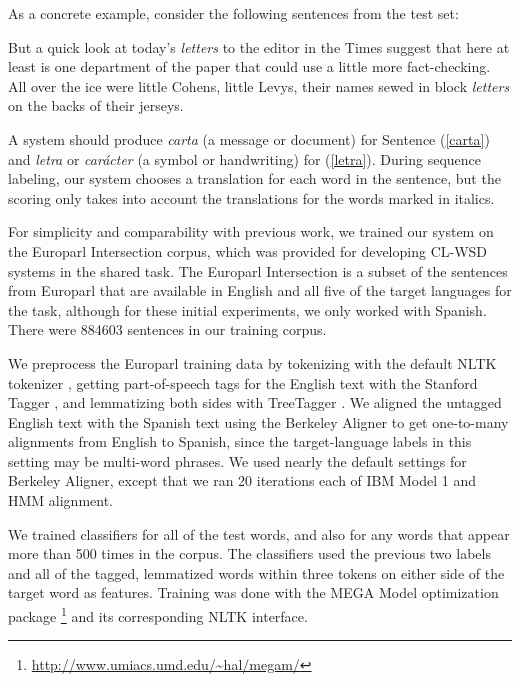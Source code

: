As a concrete example, consider the following sentences from the test set:

\begin{exe}
\ex\label{carta} But a quick look at today's \emph{letters} to the editor in
the Times suggest that here at least is one department of the paper that could
use a little more fact-checking.
\ex\label{letra} All over the ice were little Cohens, little Levys, their names
sewed in block \emph{letters} on the backs of their jerseys.
\end{exe}

A system should produce \emph{carta} (a message or document) for Sentence
(\ref{carta}) and \emph{letra} or \emph{car\'{a}cter} (a symbol or handwriting)
for (\ref{letra}). During sequence labeling, our system chooses a translation
for each word in the sentence, but the scoring only takes into account the
translations for the words marked in italics.

For simplicity and comparability with previous work, we trained our system on
the Europarl Intersection corpus, which was provided for developing CL-WSD
systems in the shared task.  The Europarl Intersection is a subset of the
sentences from Europarl \cite{europarl} that are available in English and all
five of the target languages for the task, although for these initial
experiments, we only worked with Spanish. There were 884603 sentences in our
training corpus.

We preprocess the Europarl training data by tokenizing with the default NLTK
tokenizer \cite{nltkbook}, getting part-of-speech tags for the English text
with the Stanford Tagger \cite{Toutanova03feature-richpart-of-speech}, and
lemmatizing both sides with TreeTagger \cite{Schmid95improvementsin}.  We
aligned the untagged English text with the Spanish text using the Berkeley
Aligner \cite{denero-klein:2007:ACLMain} to get one-to-many alignments from
English to Spanish, since the target-language labels in this setting may be
multi-word phrases. We used nearly the default settings for Berkeley Aligner,
except that we ran 20 iterations each of IBM Model 1 and HMM alignment.

We trained classifiers for all of the test words, and also for any words that
appear more than 500 times in the corpus. The classifiers used the previous two
labels and all of the tagged, lemmatized words within three tokens on either
side of the target word as features. Training was done with the MEGA Model
optimization package \footnote{\url{http://www.umiacs.umd.edu/~hal/megam/}} and
its corresponding NLTK interface.

